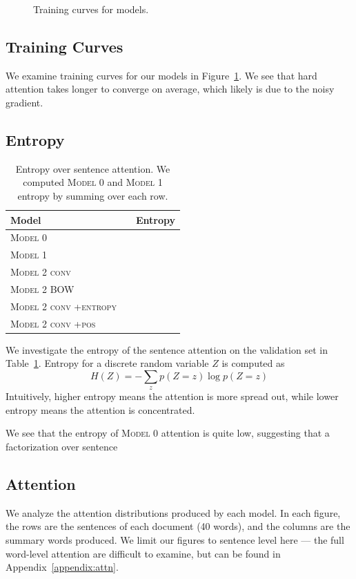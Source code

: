 \documentclass[12pt]{report}
\begin{document}
\begin{figure}
\caption{Training curves for models.} %
\label{fig:train_curves}
\end{figure}


\subsection{Training Curves} We examine training curves for our models in Figure~\ref{fig:train_curves}. We see that hard attention takes longer to converge on average, which likely is due to the noisy gradient.




\subsection{Entropy}

\begin{table}[t]
\centering
\begin{tabular}{llr}
\toprule
Model & & Entropy \\
\midrule
\textsc{Model 0} \\
\textsc{Model 1} \\
\textsc{Model 2 conv} \\
\textsc{Model 2 BOW} \\
\textsc{Model 2 conv +entropy}  \\
\textsc{Model 2 conv +pos} \\
\bottomrule
\end{tabular}
\caption{Entropy over sentence attention. We computed \textsc{Model 0} and \textsc{Model 1} entropy by summing over each row.}
\label{table:entropy}
\end{table}

We investigate the entropy of the sentence attention on the validation set in Table~\ref{table:entropy}. Entropy for a discrete random variable $Z$ is computed as
$$H(Z) = -\sum_{z} p(Z = z) \log p(Z = z)$$
Intuitively, higher entropy means the attention is more spread out, while lower entropy means the attention is concentrated.

We see that the entropy of \textsc{Model 0} attention is quite low, suggesting that a factorization over sentence


\subsection{Attention}
We analyze the attention distributions produced by each model. In each figure, the rows are the sentences of each document (40 words), and the columns are the summary words produced. We limit our figures to sentence level here --- the full word-level attention are difficult to examine, but can be found in Appendix~\ref{appendix:attn}.
\end{document}
